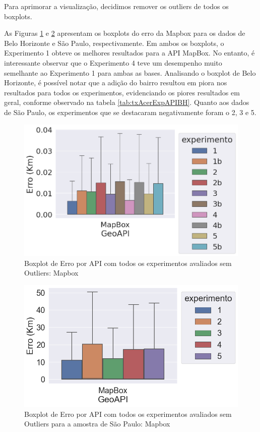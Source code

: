 Para aprimorar a visualização, decidimos remover os outliers de todos os boxplots.

As Figuras \ref{fig:boxplot-api-mapbox-semout-bh} e \ref{fig:boxplot-api-mapbox-semout-sp} apresentam os boxplots do erro da Mapbox para os dados de Belo Horizonte e São Paulo, respectivamente. Em ambos os boxplots, o Experimento 1 obteve os melhores resultados para a API MapBox. No entanto, é interessante observar que o Experimento 4 teve um desempenho muito semelhante ao Experimento 1 para ambas as bases. Analisando o boxplot de Belo Horizonte, é possível notar que a adição do bairro resultou em piora nos resultados para todos os experimentos, evidenciando os piores resultados em geral, conforme observado na tabela \ref{tab:txAcerExpAPIBH}. Quanto aos dados de São Paulo, os experimentos que se destacaram negativamente foram o 2, 3 e 5.

\begin{figure}[h]
    \centering
    \includegraphics[width=\textwidth]{Figuras/boxplotApiMapboxSemOut.png}
    \caption{Boxplot de Erro por API com todos os experimentos avaliados sem Outliers: Mapbox}
    \label{fig:boxplot-api-mapbox-semout-bh}
\end{figure}

\begin{figure}[h]
  \centering
  \includegraphics[width=\textwidth]{Figuras/boxplotApiMapboxSemOutsp.png}
  \caption{Boxplot de Erro por API com todos os experimentos avaliados sem Outliers para a amostra de São Paulo: Mapbox}
  \label{fig:boxplot-api-mapbox-semout-sp}
\end{figure}

